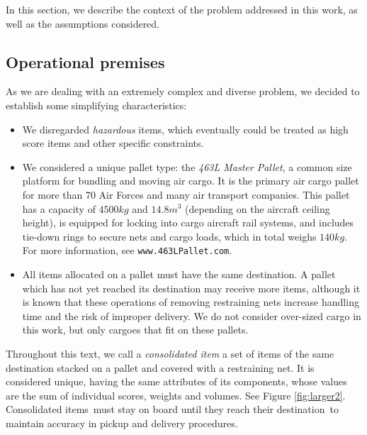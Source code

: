 \documentclass[preprint,authoryear]{elsarticle}
\begin{document}
In this section, we describe the context of the problem addressed in this work, as well as the assumptions considered.

\subsection{Operational premises}

As we are dealing with an extremely complex and diverse problem, we decided to establish some simplifying characteristics:

\begin{itemize}
		
	\item We disregarded {\it hazardous} items, which eventually could be treated as high score items and other specific constraints.
	
	\item We considered a unique pallet type: the {\it 463L Master Pallet}, a common size platform for bundling and moving air cargo. It is the primary air cargo pallet for more than 70 Air Forces and many air transport companies. This pallet has a capacity of $4500 kg$ and $14.8 m^3$ (depending on the aircraft ceiling height), is equipped for locking into cargo aircraft rail systems, and includes tie-down rings to secure nets and cargo loads, which in total weighs $140 kg$. For more information, see {\tt www.463LPallet.com}.
	
	\item All items allocated on a pallet must have the same destination. A pallet which has not yet reached its destination may receive more items, although it is known that these operations of removing restraining nets increase handling time and the risk of improper delivery. We do not consider over-sized cargo in this work, but only cargoes that fit on these pallets.
	
\end{itemize}

Throughout this text, we call a {\it consolidated item} a set of items of the same destination stacked on a pallet and covered with a restraining net. It is considered unique, having the same attributes of its components, whose values are the sum of individual scores, weights and volumes. See Figure \ref{fig:larger2}.
Consolidated items must stay on board until they reach their destination to maintain accuracy in pickup and delivery procedures.
\end{document}
